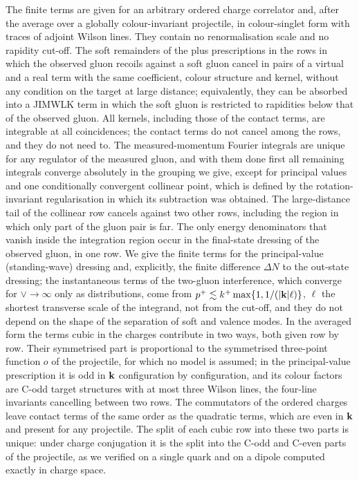 The finite terms are given for an arbitrary ordered charge correlator and, after the average over a globally colour-invariant projectile, in colour-singlet form with traces of adjoint Wilson lines. They contain no renormalisation scale and no rapidity cut-off. The soft remainders of the plus prescriptions in the rows in which the observed gluon recoils against a soft gluon cancel in pairs of a virtual and a real term with the same coefficient, colour structure and kernel, without any condition on the target at large distance; equivalently, they can be absorbed into a JIMWLK term in which the soft gluon is restricted to rapidities below that of the observed gluon. All kernels, including those of the contact terms, are integrable at all coincidences; the contact terms do not cancel among the rows, and they do not need to. The measured-momentum Fourier integrals are unique for any regulator of the measured gluon, and with them done first all remaining integrals converge absolutely in the grouping we give, except for principal values and one conditionally convergent collinear point, which is defined by the rotation-invariant regularisation in which its subtraction was obtained. The large-distance tail of the collinear row cancels against two other rows, including the region in which only part of the gluon pair is far. The only energy denominators that vanish inside the integration region occur in the final-state dressing of the observed gluon, in one row. We give the finite terms for the principal-value (standing-wave) dressing and, explicitly, the finite difference $\Delta N$ to the out-state dressing; the instantaneous terms of the two-gluon interference, which converge for $\vee\to\infty$ only as distributions, come from $p^+\lesssim k^+\max\{1,1/(|\mathbf{k}|\ell)\}$, $\ell$ the shortest transverse scale of the integrand, not from the cut-off, and they do not depend on the shape of the separation of soft and valence modes. In the averaged form the terms cubic in the charges contribute in two ways, both given row by row. Their symmetrised part is proportional to the symmetrised three-point function $o$ of the projectile, for which no model is assumed; in the principal-value prescription it is odd in $\mathbf{k}$ configuration by configuration, and its colour factors are C-odd target structures with at most three Wilson lines, the four-line invariants cancelling between two rows. The commutators of the ordered charges leave contact terms of the same order as the quadratic terms, which are even in $\mathbf{k}$ and present for any projectile. The split of each cubic row into these two parts is unique: under charge conjugation it is the split into the C-odd and C-even parts of the projectile, as we verified on a single quark and on a dipole computed exactly in charge space.


